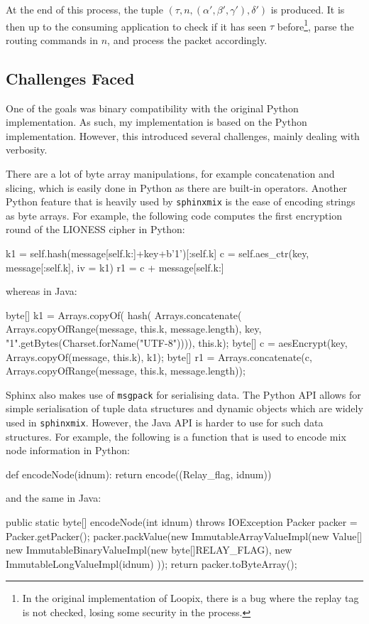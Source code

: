 \documentclass[final,dissertation.tex]{subfiles}
\begin{document}
At the end of this process, the tuple $(\tau, n, (\alpha', \beta', \gamma'), \delta')$ is produced. It is then up to the consuming application to check if it has seen $\tau$ before\footnote{In the original implementation of Loopix, there is a bug where the replay tag is not checked, losing some security in the process. }, parse the routing commands in $n$, and process the packet accordingly.

\subsection{Challenges Faced}

One of the goals was binary compatibility with the original Python implementation. As such, my implementation is based on the Python implementation. However, this introduced several challenges, mainly dealing with verbosity.

There are a lot of byte array manipulations, for example concatenation and slicing, which is easily done in Python as there are built-in operators. Another Python feature that is heavily used by \verb|sphinxmix| is the ease of encoding strings as byte arrays. For example, the following code computes the first encryption round of the LIONESS cipher in Python:

\begin{pythoncode}
k1 = self.hash(message[self.k:]+key+b'1')[:self.k]
c = self.aes_ctr(key, message[:self.k], iv = k1)
r1 = c + message[self.k:]
\end{pythoncode}
whereas in Java:
\begin{javacode}
byte[] k1 = Arrays.copyOf(
    hash(
        Arrays.concatenate(
            Arrays.copyOfRange(message, this.k, message.length), 
            key, 
            "1".getBytes(Charset.forName("UTF-8")))), 
        this.k);
byte[] c = aesEncrypt(key, Arrays.copyOf(message, this.k), k1);
byte[] r1 = Arrays.concatenate(c, 
    Arrays.copyOfRange(message, this.k, message.length));
\end{javacode}

Sphinx also makes use of \verb|msgpack| for serialising data. The Python API allows for simple serialisation of tuple data structures and dynamic objects which are widely used in \verb|sphinxmix|. However, the Java API is harder to use for such data structures. For example, the following is a function that is used to encode mix node information in Python:

\begin{pythoncode}
def encodeNode(idnum):
    return encode((Relay_flag, idnum))
\end{pythoncode}
and the same in Java:
\begin{javacode}
public static byte[] encodeNode(int idnum) throws IOException {
    Packer packer = Packer.getPacker();
    packer.packValue(new ImmutableArrayValueImpl(new Value[] {
        new ImmutableBinaryValueImpl(new byte[]{RELAY_FLAG}),
        new ImmutableLongValueImpl(idnum)
    }));
    return packer.toByteArray();
}
\end{javacode}
\end{document}
